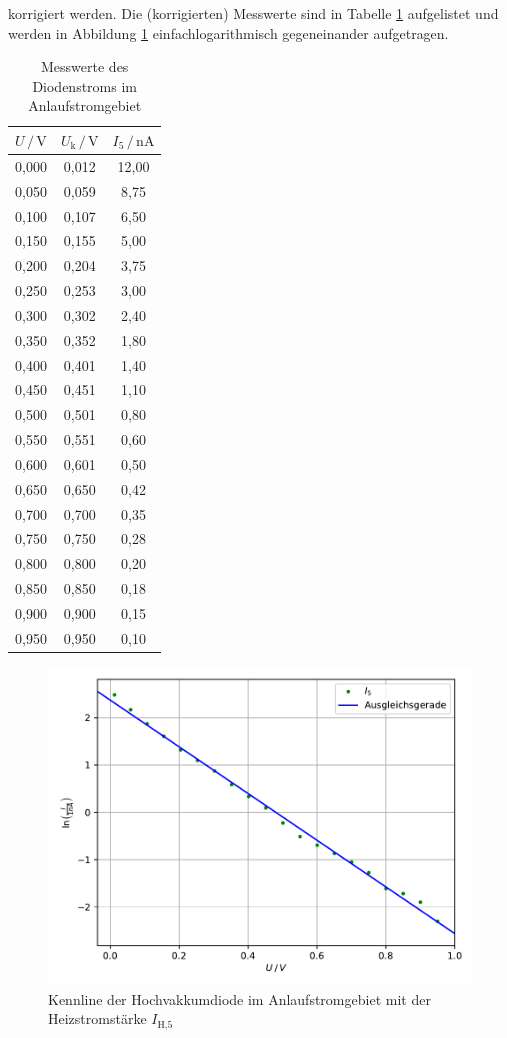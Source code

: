 korrigiert werden.
Die (korrigierten) Messwerte sind in 
Tabelle \ref{tab:mess2} aufgelistet und werden in Abbildung \ref{fig:plot3}
einfachlogarithmisch gegeneinander aufgetragen.

\begin{table}
  \centering
  \caption{Messwerte des Diodenstroms im Anlaufstromgebiet}
  \label{tab:mess2}
  \begin{tabular}{c c c}
  \toprule
  $ U \,/\, \si{\volt} $ & $ U_\text{k} \,/\, \si{\volt} $ & $I_5 \,/\, \si{\nano\ampere}$\\
  \midrule 
  0,000 & 0,012 & 12,00 \\
  0,050 & 0,059 &  8,75 \\
  0,100 & 0,107 &  6,50 \\
  0,150 & 0,155 &  5,00 \\
  0,200 & 0,204 &  3,75 \\
  0,250 & 0,253 &  3,00 \\
  0,300 & 0,302 &  2,40 \\
  0,350 & 0,352 &  1,80 \\
  0,400 & 0,401 &  1,40 \\
  0,450 & 0,451 &  1,10 \\
  0,500 & 0,501 &  0,80 \\
  0,550 & 0,551 &  0,60 \\
  0,600 & 0,601 &  0,50 \\
  0,650 & 0,650 &  0,42 \\
  0,700 & 0,700 &  0,35 \\
  0,750 & 0,750 &  0,28 \\
  0,800 & 0,800 &  0,20 \\
  0,850 & 0,850 &  0,18 \\
  0,900 & 0,900 &  0,15 \\
  0,950 & 0,950 &  0,10 \\
  \bottomrule
  \end{tabular}
  \end{table}

  \begin{figure} [H]
    \centering
    \includegraphics{content/plot3.pdf}
    \caption{Kennline der Hochvakkumdiode im Anlaufstromgebiet mit der Heizstromstärke $I_\text{H,5}$}
    \label{fig:plot3}
  \end{figure}

